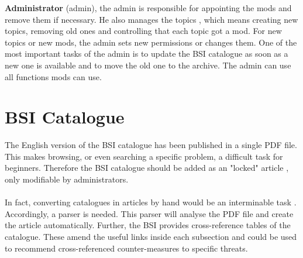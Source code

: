 \textbf{Administrator} (admin), the admin is responsible for appointing the mods and remove them if necessary. 
He also manages the topics , which means creating new topics, removing old ones and controlling that each topic got a mod. 
For new topics or new mods, the admin sets new permissions or changes them. 
One of the most important tasks of the admin is to update the BSI catalogue as soon as a new one is available and to move the old one to the archive. 
The admin can use all functions mods can use.


\section{BSI Catalogue}
The English version of the BSI catalogue has been published in a single PDF file. 
This makes browsing, or even searching a specific problem, a difficult task for beginners. 
Therefore the BSI catalogue should be added as an "locked" article , only modifiable by administrators.
\\\\
In fact, converting catalogues in articles by hand would be an interminable task . 
Accordingly, a parser is needed. 
This parser will analyse the PDF file and create the article automatically. 
Further, the BSI provides cross-reference tables of the catalogue. 
These amend the useful links inside each subsection and could be used to recommend cross-referenced counter-measures to specific threats.


